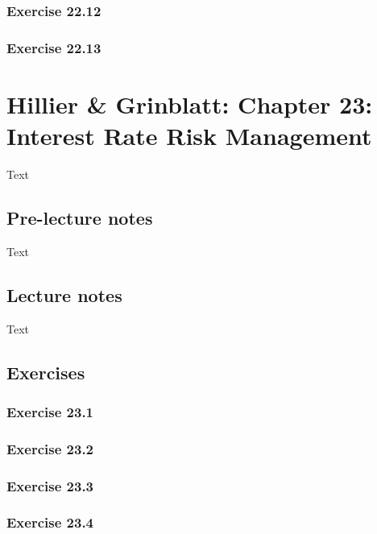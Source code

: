 \documentclass[]{book}
\theoremstyle{definition}
\theoremstyle{definition}
\theoremstyle{remark}
\begin{document}
\subsection{Exercise 22.12}\label{exercise-22.12}

\subsection{Exercise 22.13}\label{exercise-22.13}

\chapter{Hillier \& Grinblatt: Chapter 23: Interest Rate Risk
Management}\label{hillier-grinblatt-chapter-23-interest-rate-risk-management}

Text

\section{Pre-lecture notes}\label{pre-lecture-notes-23}

Text

\section{Lecture notes}\label{lecture-notes-23}

Text

\section{Exercises}\label{exercises-23}

\subsection{Exercise 23.1}\label{exercise-23.1}

\subsection{Exercise 23.2}\label{exercise-23.2}

\subsection{Exercise 23.3}\label{exercise-23.3}

\subsection{Exercise 23.4}\label{exercise-23.4}
\end{document}
